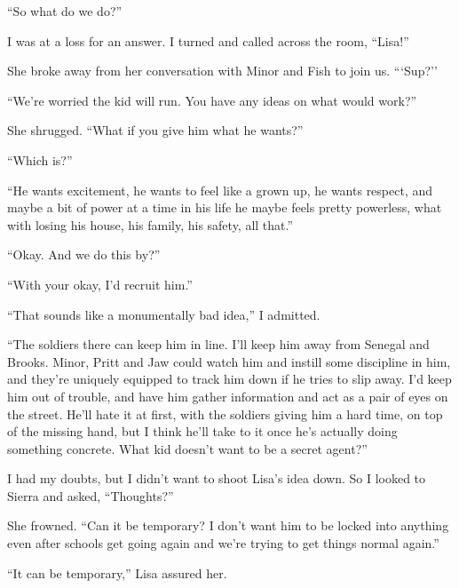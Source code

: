 ``So what do we do?''



I was at a loss for an answer.  I turned and called across the room, ``Lisa!''



She broke away from her conversation with Minor and Fish to join us.  ```Sup?''



``We're worried the kid will run.  You have any ideas on what would work?''



She shrugged. ``What if you give him what he wants?''



``Which is?''



``He wants excitement, he wants to feel like a grown up, he wants respect, and maybe a bit of power at a time in his life he maybe feels pretty powerless, what with losing his house, his family, his safety, all that.''



``Okay.  And we do this by?''



``With your okay, I'd recruit him.''



``That sounds like a monumentally bad idea,'' I admitted.



``The soldiers there can keep him in line.  I'll keep him away from Senegal and Brooks.  Minor, Pritt and Jaw could watch him and instill some discipline in him, and they're uniquely equipped to track him down if he tries to slip away.  I'd keep him out of trouble, and have him gather information and act as a pair of eyes on the street.  He'll hate it at first, with the soldiers giving him a hard time, on top of the missing hand, but I think he'll take to it once he's actually doing something concrete.  What kid doesn't want to be a secret agent?''



I had my doubts, but I didn't want to shoot Lisa's idea down.  So I looked to Sierra and asked, ``Thoughts?''



She frowned.  ``Can it be temporary?  I don't want him to be locked into anything even after schools get going again and we're trying to get things normal again.''



``It can be temporary,'' Lisa assured her.



